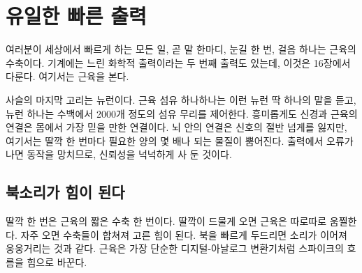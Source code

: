 \chapter{유일한 빠른 출력}

여러분이 세상에서 빠르게 하는 모든 일, 곧 말 한마디, 눈길 한 번, 걸음 하나는 근육의 수축이다. 기계에는 느린 화학적 출력이라는 두 번째 출력도 있는데, 이것은 16장에서 다룬다. 여기서는 근육을 본다.

사슬의 마지막 고리는  뉴런이다. 근육 섬유 하나하나는 이런 뉴런 딱 하나의 말을 듣고, 뉴런 하나는 수백에서 2000개 정도의 섬유 무리를 제어한다. 흥미롭게도 신경과 근육의 연결은 몸에서 가장 믿을 만한 연결이다. 뇌 안의 연결은 신호의 절반 넘게를 잃지만, 여기서는 딸깍 한 번마다 필요한 양의 몇 배나 되는 물질이 뿜어진다. 출력에서 오류가 나면 동작을 망치므로, 신뢰성을 넉넉하게 사 둔 것이다.

\section*{북소리가 힘이 된다}

딸깍 한 번은 근육의 짧은 수축 한 번이다. 딸깍이 드물게 오면 근육은 따로따로 움찔한다. 자주 오면 수축들이 합쳐져 고른 힘이 된다. 북을 빠르게 두드리면 소리가 이어져 웅웅거리는 것과 같다. 근육은 가장 단순한 디지털-아날로그 변환기처럼 스파이크의 흐름을 힘으로 바꾼다.

